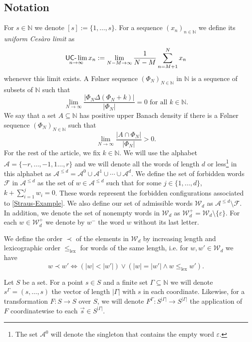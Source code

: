 \documentclass[letter,11pt]{article}
\theoremstyle{definition}
\newcommand{\N}{\mathbb{N}}
\newcommand{\sF}{\mathcal{F}}
\newcommand{\sA}{\mathcal{A}}
\newcommand{\uclim}{\mathop{\textup{\textsf{UC-}}\lim}}
\begin{document}
\subsection{Notation}
For $s\in \N$ we denote $[s]:=\{1,\ldots,s\}$. For a sequence $(x_n)_{n\in \N}$ we define its \textit{uniform Cesàro limit} as   
$$\uclim_{n\to \infty} x_n :=\lim_{N-M\to \infty} \frac{1}{N-M}\sum_{n=M+1}^N x_n$$
whenever this limit exists. A F\o lner sequence $(\Phi_N)_{N\in\N}$ in $\N$ is a sequence of subsets of $\N$ such that 
$$ \lim_{N\to \infty} \frac{|\Phi_N \Delta (\Phi_N+k)|}{|\Phi_N|}=0 \text{ for all }k\in \N.$$
We say that a set $A\subseteq \N$ has positive upper Banach density if there is a F\o lner sequence $(\Phi_N)_{N\in \N}$ such that 
$$ \lim_{N\to \infty} \frac{|A \cap \Phi_N|}{|\Phi_N|}>0.$$
For the rest of the article, we fix $k\in \N$. We will use the alphabet $\sA=\{-r,\ldots,-1,1 \ldots,r\}$ and we will denote all the words of length $d$ or less\footnote{The set $\mathcal{A}^0$ will denote the singleton that contains the empty word $\varepsilon$.} in this alphabet as $\sA^{\leq d}= \sA^0 \cup \sA^1\cup\cdots\cup \sA^{d}$. We define the set of forbidden words $\mathcal{F}$ in $\mathcal{A}^{\leq d}$ as the set of $w\in \sA^{\leq d}$ such that for some $j\in \{1,\ldots,d\}$, $k+\sum_{i=1}^j w_i=0$. These words represent the forbidden configurations associated to \cref{Straus-Example}. We also define our set of admissible words $\mathcal{W}_d$ as $\sA^{\leq d}\setminus \sF$. In addition, we denote the set of nonempty words in $\mathcal{W}_d$ as $\mathcal{W}_d^{+}=\mathcal{W}_d\setminus\{\varepsilon\}$. For each $w\in \mathcal{W}_d^{+}$ we denote by $w^-$ the word $w$ without its last letter.


We define the order $\prec$ of the elements in $\mathcal{W}_d$ by increasing length and lexicographic order $\leq_{\text{lex}}$ for words of the same length, i.e. for $w,w'\in \mathcal{W}_d$ we have
\begin{equation*}
    w\prec w' \iff (|w|<|w'|) \lor (|w|=|w'| \land w\leq_{\text{lex}} w'). 
\end{equation*}

Let $S$ be a set. For a point $s\in S$ and a finite set $\Gamma\subseteq \N$ we will denote $s^{\Gamma}=(s,\ldots,s) $ the vector of length $|\Gamma|$ with $s$ in each coordinate. Likewise, for a transformation $F:S\to S$ over $S$, we will denote $F^{\Gamma}:S^{|\Gamma|}\to S^{|\Gamma|}$ the application of $F$ coordinatewise to each $\Vec{s}\in S^{|\Gamma|}$.
\end{document}
